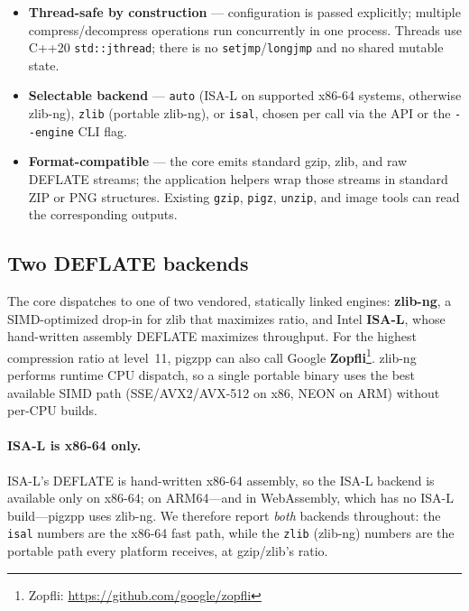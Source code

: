 \documentclass{pigzpp-whitepaper}
\begin{document}
\begin{itemize}
  \item \textbf{Thread-safe by construction} --- configuration is passed
  explicitly; multiple compress/decompress operations run concurrently in one
  process. Threads use C++20 \texttt{std::jthread}; there is no
  \texttt{setjmp}\slash\texttt{longjmp} and no shared mutable state.
  \item \textbf{Selectable backend} --- \texttt{auto} (ISA-L on supported
  x86-64 systems, otherwise zlib-ng), \texttt{zlib} (portable zlib-ng), or
  \texttt{isal}, chosen per call via the API or the \texttt{-{}-engine} CLI flag.
  \item \textbf{Format-compatible} --- the core emits standard gzip, zlib, and
  raw DEFLATE streams; the application helpers wrap those streams in standard
  ZIP or PNG structures. Existing \texttt{gzip}, \texttt{pigz}, \texttt{unzip},
  and image tools can read the corresponding outputs.
\end{itemize}

\subsection{Two DEFLATE backends}
The core dispatches to one of two vendored, statically linked engines:
\textbf{zlib-ng}, a SIMD-optimized drop-in for zlib that maximizes
ratio, and Intel \textbf{ISA-L}, whose hand-written assembly DEFLATE
maximizes throughput. For the highest compression ratio at level~11, pigzpp can
also call Google \textbf{Zopfli}\footnote{Zopfli:
\url{https://github.com/google/zopfli}}. zlib-ng performs runtime CPU
dispatch, so a single portable binary uses the best available SIMD path
(SSE/AVX2/AVX-512 on x86, NEON on ARM) without per-CPU builds.

\paragraph{ISA-L is x86-64 only.} ISA-L's DEFLATE is hand-written x86-64
assembly, so the ISA-L backend is available only on x86-64; on ARM64---and in
WebAssembly, which has no ISA-L build---pigzpp uses zlib-ng. We therefore report
\emph{both} backends throughout: the \texttt{isal} numbers are the x86-64 fast
path, while the \texttt{zlib} (zlib-ng) numbers are the portable path every
platform receives, at gzip/zlib's ratio.
\end{document}
